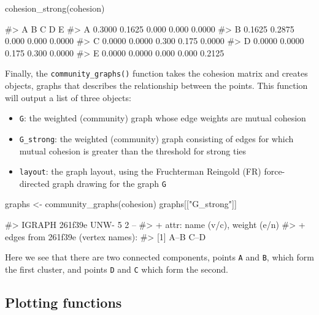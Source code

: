 \begin{Schunk}
\begin{Sinput}
cohesion_strong(cohesion)
\end{Sinput}
\begin{Soutput}
#>        A      B     C     D      E
#> A 0.3000 0.1625 0.000 0.000 0.0000
#> B 0.1625 0.2875 0.000 0.000 0.0000
#> C 0.0000 0.0000 0.300 0.175 0.0000
#> D 0.0000 0.0000 0.175 0.300 0.0000
#> E 0.0000 0.0000 0.000 0.000 0.2125
\end{Soutput}
\end{Schunk}

Finally, the \texttt{community\_graphs()} function takes the cohesion
matrix and creates  objects, graphs that describes the
relationship between the points. This function will output a list of
three objects:

\begin{itemize}
\tightlist
\item
  \texttt{G}: the weighted (community) graph whose edge weights are
  mutual cohesion
\item
  \texttt{G\_strong}: the weighted (community) graph consisting of edges
  for which mutual cohesion is greater than the threshold for strong
  ties
\item
  \texttt{layout}: the graph layout, using the Fruchterman Reingold (FR)
  force-directed graph drawing for the graph \texttt{G}
\end{itemize}

\begin{Schunk}
\begin{Sinput}
graphs <- community_graphs(cohesion)
graphs[["G_strong"]]
\end{Sinput}
\begin{Soutput}
#> IGRAPH 261f39e UNW- 5 2 -- 
#> + attr: name (v/c), weight (e/n)
#> + edges from 261f39e (vertex names):
#> [1] A--B C--D
\end{Soutput}
\end{Schunk}

Here we see that there are two connected components, points \texttt{A}
and \texttt{B}, which form the first cluster, and points \texttt{D} and
\texttt{C} which form the second.

\hypertarget{plotting-functions}{%
\subsection{Plotting functions}\label{plotting-functions}}

